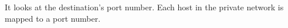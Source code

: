 It looks at the destination's port number. Each host in the private network is mapped to a port number.
